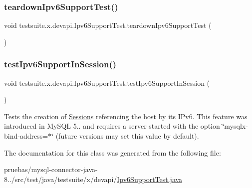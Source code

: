\mbox{\label{classtestsuite_1_1x_1_1devapi_1_1_ipv6_support_test_a34e03da98716f0156b07ebc05bf39dfb}} 
\subsubsection{\texorpdfstring{teardown\+Ipv6\+Support\+Test()}{teardownIpv6SupportTest()}}
{\footnotesize\ttfamily void testsuite.\+x.\+devapi.\+Ipv6\+Support\+Test.\+teardown\+Ipv6\+Support\+Test (\begin{DoxyParamCaption}{ }\end{DoxyParamCaption})}

\mbox{\label{classtestsuite_1_1x_1_1devapi_1_1_ipv6_support_test_ad44a8fcc40b066934a89a590ed693517}} 
\subsubsection{\texorpdfstring{test\+Ipv6\+Support\+In\+Session()}{testIpv6SupportInSession()}}
{\footnotesize\ttfamily void testsuite.\+x.\+devapi.\+Ipv6\+Support\+Test.\+test\+Ipv6\+Support\+In\+Session (\begin{DoxyParamCaption}{ }\end{DoxyParamCaption})}

Tests the creation of \mbox{\hyperlink{}{Session}}s referencing the host by its I\+Pv6. This feature was introduced in My\+S\+QL 5.. and requires a server started with the option \char`\"{}mysqlx-\/bind-\/address=$\ast$\char`\"{} (future versions may set this value by default). 

The documentation for this class was generated from the following file\+:\begin{DoxyCompactItemize}
\item 
pruebas/mysql-\/connector-\/java-\/8../src/test/java/testsuite/x/devapi/\mbox{\hyperlink{_ipv6_support_test_8java}{Ipv6\+Support\+Test.\+java}}\end{DoxyCompactItemize}
